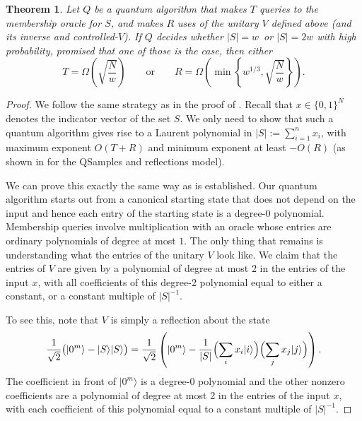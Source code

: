 \documentclass[10pt,a4paper]{article}
\newtheorem{theorem}{Theorem}
\newcommand{\<}{\langle}
\renewcommand{\>}{\rangle}
\begin{document}
\begin{theorem} \label{thm:finalthm} \label{thm:unitary}
Let $Q$ be a quantum algorithm that makes $T$ queries to the membership oracle for $S$,
and makes $R$ uses of the unitary $V$ defined above (and its inverse and controlled-$V$).
If $Q$ decides whether $\left\vert S\right\vert =w$\ or $\left\vert S\right\vert =2w$
with high probability, promised that one of those is the case, then either
\begin{equation}
T=\Omega\left(  \sqrt{\frac{N}{w}}\right)  \qquad \textrm{or} \qquad
R=\Omega\left(  \min\left\{  w^{1/3},\sqrt{\frac{N}{w}}\right\}  \right).
\end{equation}
\end{theorem}
\begin{proof}
We follow the same strategy as in
the proof of . Recall that $x \in \{0, 1\}^N$ denotes the indicator vector of the set $S$. We only need to show that such a quantum algorithm gives rise to a Laurent polynomial in $|S|:=\sum_{i=1}^n x_i$, with maximum exponent $O(T+R)$ and minimum exponent at least $-O(R)$ (as shown in  for the QSamples and reflections model).

We can prove this exactly the same way as  is established. Our quantum algorithm starts out from a canonical starting state that does not depend on the input and hence each entry of the starting state is a degree-$0$ polynomial.
Membership queries involve multiplication with an oracle whose entries are ordinary polynomials of degree at most $1$. The only thing that remains is understanding what the entries of the unitary $V$ look like. We claim that the entries of $V$ are given
by a polynomial of degree at most 2 in the entries of the input $x$,
with all coefficients of this degree-2 polynomial equal
to either a constant, or a constant multiple of $|S|^{-1}$.

To see this, note that $V$ is simply a reflection about the state
\begin{equation}
    \frac{1}{\sqrt{2}}\bigl(|0^m\>-|S\>|S\>\bigr)
    = \frac{1}{\sqrt{2}}\left(|0^m\>-\frac{1}{|S|}\Bigl(\sum_{i}x_i|i\>\Bigr)\Bigl(\sum_{j}x_j|j\>\Bigr)
    \right).
\end{equation} 
The coefficient in front of $|0^m\>$ is a degree-$0$ polynomial and the other nonzero coefficients are
a polynomial of degree at most 2 in the entries of the input $x$, with each coefficient of this polynomial equal to a constant multiple of $|S|^{-1}$.


\end{proof}
\end{document}

